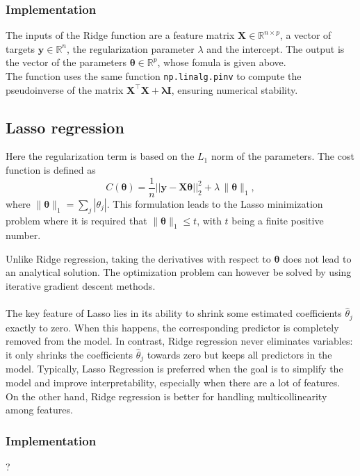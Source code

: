 \documentclass[
 reprint,            %
 amsmath,amssymb,
 aps,
]{revtex4-2}
\begin{document}
\subsubsection{Implementation}
The inputs of the Ridge function are a feature matrix $\mathbf{X} \in \mathbb{R}^{n \times p}$, a vector of targets $\mathbf{y} \in \mathbb{R}^n$, the regularization parameter $\lambda$ and the intercept. The output is the vector of the parameters $\boldsymbol{\theta} \in \mathbb{R}^{p}$, whose fomula is given above.\\
The function uses the same function \texttt{np.linalg.pinv} to compute the pseudoinverse of the matrix $\mathbf{X}^\top \mathbf{X} + \boldsymbol{\lambda}\mathbf{I}$, ensuring numerical stability.

\subsection{Lasso regression}
Here the regularization term is based on the $L_1$ norm of the parameters\cite{hjorthjensen_week35}.
The cost function is defined as
$$
C(\boldsymbol{\theta}) 
= \frac{1}{n}\vert\vert \boldsymbol{y}-\boldsymbol{X}\boldsymbol{\theta}\vert\vert_2^2
+ \lambda \, \|\boldsymbol{\theta}\|_1,
$$
where $\|\boldsymbol{\theta}\|_1 = \sum_{j}|\theta_j|$.  
This formulation leads to the Lasso minimization problem where it is required that $\|\boldsymbol{\theta}\|_1 \leq t$, with $t$ being a finite positive number. 

Unlike Ridge regression, taking the derivatives with respect to $\boldsymbol{\theta}$ does not lead to an analytical solution. 
The optimization problem can however be solved by using iterative gradient descent methods.\\ \\
The key feature of Lasso lies in its ability to shrink some estimated coefficients $\hat{\theta}_j$ exactly to zero. 
When this happens, the corresponding predictor is completely removed from the model.  
In contrast, Ridge regression never eliminates variables: it only shrinks the coefficients $\hat{\theta}_j$ towards zero but keeps all predictors in the model.
Typically, Lasso Regression is preferred when the goal is to simplify the model and improve interpretability, especially when there are a lot of features. On the other hand, Ridge regression is better for handling multicollinearity among features. 

\subsubsection{Implementation}
? 
\end{document}
